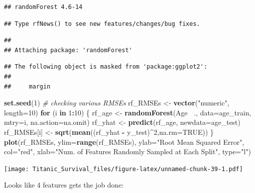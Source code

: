 \documentclass[]{article}
\newenvironment{Shaded}{\begin{snugshade}}{\end{snugshade}}
\newcommand{\KeywordTok}[1]{\textcolor[rgb]{0.13,0.29,0.53}{\textbf{#1}}}
\newcommand{\DataTypeTok}[1]{\textcolor[rgb]{0.13,0.29,0.53}{#1}}
\newcommand{\DecValTok}[1]{\textcolor[rgb]{0.00,0.00,0.81}{#1}}
\newcommand{\StringTok}[1]{\textcolor[rgb]{0.31,0.60,0.02}{#1}}
\newcommand{\CommentTok}[1]{\textcolor[rgb]{0.56,0.35,0.01}{\textit{#1}}}
\newcommand{\OtherTok}[1]{\textcolor[rgb]{0.56,0.35,0.01}{#1}}
\newcommand{\ControlFlowTok}[1]{\textcolor[rgb]{0.13,0.29,0.53}{\textbf{#1}}}
\newcommand{\OperatorTok}[1]{\textcolor[rgb]{0.81,0.36,0.00}{\textbf{#1}}}
\newcommand{\NormalTok}[1]{#1}
\begin{document}
\begin{verbatim}
## randomForest 4.6-14
\end{verbatim}

\begin{verbatim}
## Type rfNews() to see new features/changes/bug fixes.
\end{verbatim}

\begin{verbatim}
## 
## Attaching package: 'randomForest'
\end{verbatim}

\begin{verbatim}
## The following object is masked from 'package:ggplot2':
## 
##     margin
\end{verbatim}

\begin{Shaded}
\begin{Highlighting}[]
\KeywordTok{set.seed}\NormalTok{(}\DecValTok{1}\NormalTok{)}
\CommentTok{# checking various RMSEs}
\NormalTok{rf_RMSEs <-}\StringTok{ }\KeywordTok{vector}\NormalTok{(}\StringTok{"numeric"}\NormalTok{, }\DataTypeTok{length=}\DecValTok{10}\NormalTok{)}
\ControlFlowTok{for}\NormalTok{ (i }\ControlFlowTok{in} \DecValTok{1}\OperatorTok{:}\DecValTok{10}\NormalTok{) \{}
\NormalTok{  rf_age <-}\StringTok{ }\KeywordTok{randomForest}\NormalTok{(Age }\OperatorTok{~}\NormalTok{., }\DataTypeTok{data=}\NormalTok{age_train, }\DataTypeTok{mtry=}\NormalTok{i, }\DataTypeTok{na.action=}\NormalTok{na.omit)}
\NormalTok{  rf_yhat <-}\StringTok{ }\KeywordTok{predict}\NormalTok{(rf_age, }\DataTypeTok{newdata=}\NormalTok{age_test)}
\NormalTok{  rf_RMSEs[i] <-}\StringTok{ }\KeywordTok{sqrt}\NormalTok{(}\KeywordTok{mean}\NormalTok{((rf_yhat }\OperatorTok{-}\StringTok{ }\NormalTok{y_test)}\OperatorTok{^}\DecValTok{2}\NormalTok{,}\DataTypeTok{na.rm=}\OtherTok{TRUE}\NormalTok{))}
\NormalTok{\}}
\KeywordTok{plot}\NormalTok{(rf_RMSEs, }\DataTypeTok{ylim=}\KeywordTok{range}\NormalTok{(rf_RMSEs), }\DataTypeTok{ylab=}\StringTok{"Root Mean Squared Error"}\NormalTok{, }\DataTypeTok{col=}\StringTok{"red"}\NormalTok{,}
     \DataTypeTok{xlab=}\StringTok{"Num. of Features Randomly Sampled at Each Split"}\NormalTok{, }\DataTypeTok{type=}\StringTok{"l"}\NormalTok{)}
\end{Highlighting}
\end{Shaded}

\texttt{[image: Titanic\_Survival\_files/figure-latex/unnamed-chunk-39-1.pdf]}

Looks like 4 features gets the job done:
\end{document}
